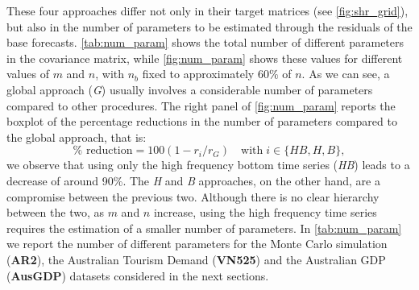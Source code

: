 \documentclass[a4paper,11pt]{article}
\theoremstyle{definition}
\begin{document}
\begin{table}[!t]
\end{table}

These four approaches differ not only in their target matrices (see \autoref{fig:shr_grid}), but also in the number of parameters to be estimated through the residuals of the base forecasts. \autoref{tab:num_param} shows the total number of different parameters in the covariance matrix, while \autoref{fig:num_param} shows these values for different values of $m$ and $n$, with $n_b$ fixed to approximately $60\%$ of $n$. As we can see, a global approach (\textit{G}) usually involves a considerable number of parameters compared to other procedures. The right panel of \autoref{fig:num_param} reports the boxplot of the percentage reductions in the number of parameters compared to the global approach, that is:
$$
	\% \text{ reduction} = 100(1-r_i/r_G) \quad \mathrm{with} \; i \in \{\textit{HB}, H, B\},
$$
we observe that using only the high frequency bottom time series (\textit{HB}) leads to a decrease of around 90\%. The \textit{H} and \textit{B} approaches, on the other hand, are a compromise between the previous two. Although there is no clear hierarchy between the two, as $m$ and $n$ increase, using the high frequency time series requires the estimation of a smaller number of parameters. In \autoref{tab:num_param} we report the number of different parameters for the Monte Carlo simulation (\textbf{AR2}), the Australian Tourism Demand (\textbf{VN525}) and the Australian GDP (\textbf{AusGDP}) datasets considered in the next sections.
\end{document}
